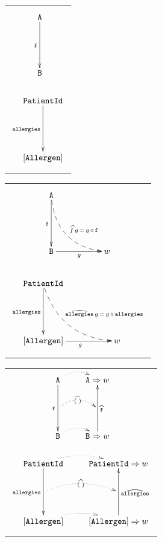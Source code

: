 \documentclass[multi=page,margin=1cm,crop]{standalone}
\begin{document}
\newcommand{\comp}{\mathop{\circ}}

\newcommand{\PatientId}{\mathtt{PatientId}}
\newcommand{\Allergen}{\mathtt{Allergen}}
\newcommand{\Bool}{\mathtt{Bool}}
\newcommand{\allergies}{\mathtt{allergies}}
\newcommand{\elem}{\mathtt{elem}}
\newcommand{\A}{\mathtt{A}}
\newcommand{\B}{\mathtt{B}}
\newcommand{\f}{\mathtt{f}}
\newcommand{\is}{\mathop{=}}

\newcommand{\preap}[1]{\widehat{#1}}
\newcommand{\Fun}[2]{#1 \Rightarrow #2}

\begin{page}
  \begin{tabular}{c}
    $$
    \xymatrix{
        \A
          \ar[dd]_{\f}
        \\
        \\ \B
      }
    $$
  \\
  \\
    $$
    \xymatrix{
      \PatientId
        \ar[dd]_{\allergies}
      \\
      \\ [\Allergen]
    }
    $$
  \end{tabular}
\end{page}

\begin{page}
  \begin{tabular}{c}
    $$
    \xymatrix{
      \A
        \ar[dd]_{\f}
        \ar@{-->}@/_2em/[ddrr]^(0.5){\mathop{\preap{f}} g \is g \comp \f}
      \\
      \\ \B
        \ar[rr]_{g}
      &
      & w
    }
    $$
  \\
  \\
    $$
    \xymatrix{
      \PatientId
        \ar[dd]_{\allergies}
        \ar@{-->}@/_2em/[ddrr]^(0.4){\mathop{\preap{\allergies}} g \is g \comp \allergies}
      \\
      \\ [\Allergen]
        \ar[rr]_{g}
      &
      & w
    }
    $$
  \end{tabular}
\end{page}

\begin{page}
  \begin{tabular}{c}
    $$
    \xymatrix{
      \A
        \ar@/^1em/@{.>}[r]
        \ar[dd]_{\f}
      & \Fun{\A}{w}
      \\
      \ar@{.>}@/^1em/[r]|{\preap{(\;)}}
      &
      \\ \B
        \ar@/^1em/@{.>}[r]
      & \Fun{\B}{w}
        \ar[uu]_{\preap{\f}}
    }
    $$
  \\
  \\
    $$
    \xymatrix{
      \PatientId
        \ar@/^1em/@{.>}[r]
        \ar[dd]_{\allergies}
      & \Fun{\PatientId}{w}
      \\
      \ar@{.>}@/^1em/[r]|{\preap{(\;)}}
      &
      \\ [\Allergen]
        \ar@/^1em/@{.>}[r]
      & \Fun{[\Allergen]}{w}
        \ar[uu]_{\preap{\allergies}}
    }
    $$
  \end{tabular}
\end{page}
\end{document}
